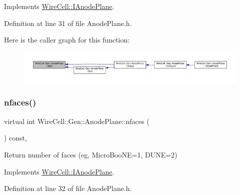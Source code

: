 Implements \hyperlink{class_wire_cell_1_1_i_anode_plane_a18dfeccffc41a8fca3631a4e98967c57}{Wire\+Cell\+::\+I\+Anode\+Plane}.



Definition at line 31 of file Anode\+Plane.\+h.

Here is the caller graph for this function\+:
\nopagebreak
\begin{figure}[H]
\begin{center}
\leavevmode
\includegraphics[width=350pt]{class_wire_cell_1_1_gen_1_1_anode_plane_afe12d9d6f826b42e66d9ab9da7799dae_icgraph}
\end{center}
\end{figure}
\mbox{\label{class_wire_cell_1_1_gen_1_1_anode_plane_a67547b54d01b3112b8a194660d1d2f2a}} 
\subsubsection{\texorpdfstring{nfaces()}{nfaces()}}
{\footnotesize\ttfamily virtual int Wire\+Cell\+::\+Gen\+::\+Anode\+Plane\+::nfaces (\begin{DoxyParamCaption}{ }\end{DoxyParamCaption}) const\hspace{0.3cm}{\ttfamily [inline]}, {\ttfamily [virtual]}}



Return number of faces (eg, Micro\+Boo\+NE=1, D\+U\+NE=2) 



Implements \hyperlink{class_wire_cell_1_1_i_anode_plane_ace24697d669e5b25613db8ad110611f0}{Wire\+Cell\+::\+I\+Anode\+Plane}.



Definition at line 32 of file Anode\+Plane.\+h.

